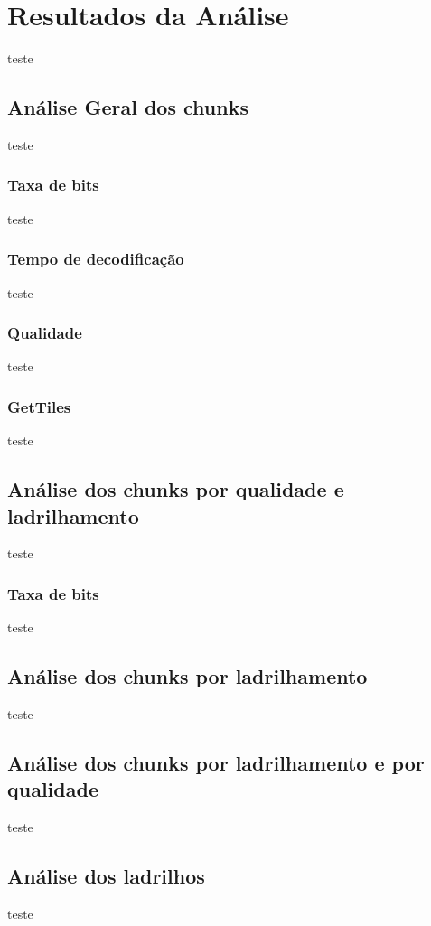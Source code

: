 \chapter{Resultados da Análise}\label{Cap:Results}
teste

\section{Análise Geral dos chunks}
teste

\subsection{Taxa de bits}
teste

\subsection{Tempo de decodificação}
teste

\subsection{Qualidade}
teste

\subsection{GetTiles}
teste

\section{Análise dos chunks por qualidade e ladrilhamento}
teste

\subsection{Taxa de bits}
teste

\section{Análise dos chunks por ladrilhamento}
teste

\section{Análise dos chunks por ladrilhamento e por qualidade}
teste

\section{Análise dos ladrilhos}
teste

